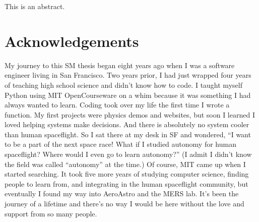 \documentclass[10pt,leftblank,twoside]{mitthesis}
\begin{document}


\cleardoublepage
\setcounter{savepage}{\thepage}
\begin{abstractpage}

This is an abstract.

\end{abstractpage}

\cleardoublepage

\section*{Acknowledgements}

My journey to this SM thesis began eight years ago when I was a software engineer living in San
Francisco. Two years prior, I had just wrapped four years of teaching high school science and didn't
know how to code. I taught myself Python using MIT OpenCourseware on a whim because it was something
I had always wanted to learn. Coding took over my life the first time I wrote a function. My first
projects were physics demos and websites, but soon I learned I loved helping systems make decisions.
And there is absolutely no system cooler than human spaceflight. So I sat there at my desk in SF and
wondered, ``I want to be a part of the next space race! What if I studied autonomy for human
spaceflight? Where would I even go to learn autonomy?'' (I admit I didn't know the field was called
``autonomy'' at the time.) Of course, MIT came up when I started searching. It took five more years of
studying computer science, finding people to learn from, and integrating in the human spaceflight
community, but eventually I found my way into AeroAstro and the MERS lab. It's been the journey of a
lifetime and there's no way I would be here without the love and support from so many people.
\end{document}
